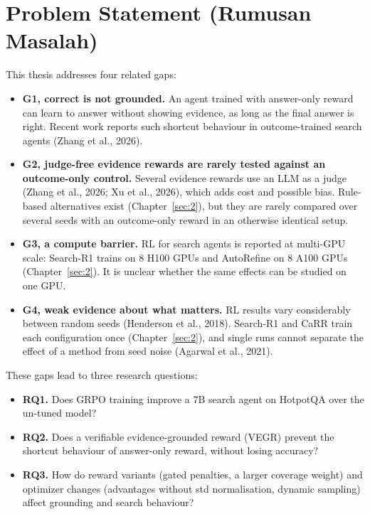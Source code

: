 \section{Problem Statement (Rumusan Masalah)}\label{sec:1.2}

This thesis addresses four related gaps:

\begin{itemize}
\tightlist
\item
  \textbf{G1, correct is not grounded.} An agent trained with
  answer-only reward can learn to answer without showing evidence, as
  long as the final answer is right. Recent work reports such shortcut
  behaviour in outcome-trained search agents (Zhang et al., 2026).
\item
  \textbf{G2, judge-free evidence rewards are rarely tested against an
  outcome-only control.} Several evidence rewards use an LLM as a judge
  (Zhang et al., 2026; Xu et al., 2026), which adds cost and possible
  bias. Rule-based alternatives exist (Chapter~\ref{sec:2}), but they
  are rarely compared over several seeds with an outcome-only reward in
  an otherwise identical setup.
\item
  \textbf{G3, a compute barrier.} RL for search agents is reported at
  multi-GPU scale: Search-R1 trains on 8 H100 GPUs and AutoRefine on 8
  A100 GPUs (Chapter~\ref{sec:2}). It is unclear whether the same
  effects can be studied on one GPU.
\item
  \textbf{G4, weak evidence about what matters.} RL results vary
  considerably between random seeds (Henderson et al., 2018). Search-R1
  and CaRR train each configuration once (Chapter~\ref{sec:2}), and
  single runs cannot separate the effect of a method from seed noise
  (Agarwal et al., 2021).
\end{itemize}

These gaps lead to three research questions:

\begin{itemize}
\tightlist
\item
  \textbf{RQ1.} Does GRPO training improve a 7B search agent on HotpotQA
  over the un-tuned model?
\item
  \textbf{RQ2.} Does a verifiable evidence-grounded reward (VEGR)
  prevent the shortcut behaviour of answer-only reward, without losing
  accuracy?
\item
  \textbf{RQ3.} How do reward variants (gated penalties, a larger
  coverage weight) and optimizer changes (advantages without std
  normalisation, dynamic sampling) affect grounding and search
  behaviour?
\end{itemize}

